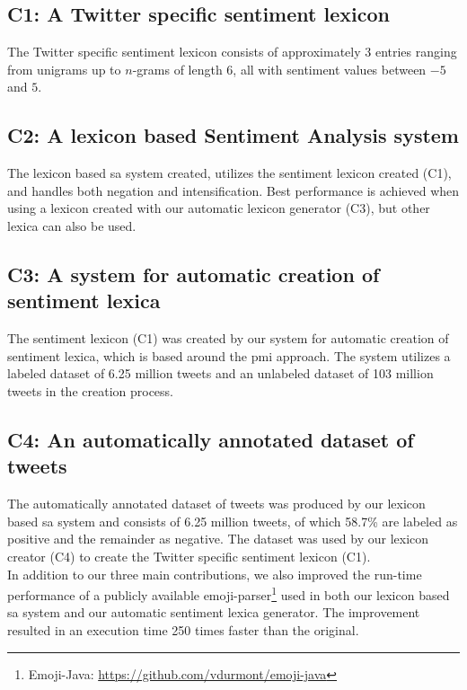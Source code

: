 \subsection*{C1: A Twitter specific sentiment lexicon}
The Twitter specific sentiment lexicon consists of approximately 3 entries ranging from unigrams up to $n$-grams of length 6, all with sentiment values between $-5$ and $5$. 

\subsection*{C2: A lexicon based Sentiment Analysis system}
The lexicon based \ac{sa} system created, utilizes the sentiment lexicon created (C1), and handles both negation and intensification. Best performance is achieved when using a lexicon created with our automatic lexicon generator (C3), but other lexica can also be used.

\subsection*{C3: A system for automatic creation of sentiment lexica}
 The sentiment lexicon (C1) was created by our system for automatic creation of sentiment lexica, which is based around the \acl{pmi} approach. The system utilizes a labeled dataset of 6.25 million tweets and an unlabeled dataset of 103 million tweets in the creation process.  \\
 
 \subsection*{C4: An automatically annotated dataset of tweets}
 The automatically annotated dataset of tweets was produced by our lexicon based \ac{sa} system and consists of 6.25 million tweets, of which 58.7\% are labeled as positive and the remainder as negative. The dataset was used by our lexicon creator (C4) to create the Twitter specific sentiment lexicon (C1).\\

 \noindent
 In addition to our three main contributions, we also improved the run-time performance of a publicly available emoji-parser\footnote{Emoji-Java: \url{https://github.com/vdurmont/emoji-java}} used in both our lexicon based \ac{sa} system and our automatic sentiment lexica generator. The improvement resulted in an execution time 250 times faster than the original. \\
 

